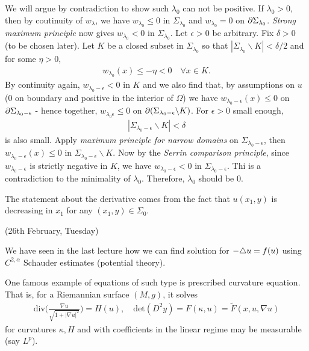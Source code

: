 \documentclass[12pt,a4paper]{article}
\newenvironment{proof}
{\begin{changemargin}{0.5cm}{0.5cm} 
	}%
	{\end{changemargin}
}
\newenvironment{p}
{\begin{proof} 
	}%
	{\end{proof}
}
\begin{document}
\begin{p}
\quad We will argue by contradiction to show such $\lambda_0$ can not be positive. If $\lambda_0 >0$, then by coutinuity of $w_{\lambda}$, we have $w_{\lambda_0} \leq 0$ in $\Sigma_{\lambda_0}$ and $w_{\lambda_0} =0$ on $\partial \Sigma_{\lambda_0}$. \emph{Strong maximum principle} now gives $w_{\lambda_0} < 0$ in $\Sigma_{\lambda_0}$.  Let $\epsilon >0$ be arbitrary. Fix $\delta >0$ (to be chosen later). Let $K$ be a closed subset in $\Sigma_{\lambda_0}$ so that $|\Sigma_{\lambda_0} \backslash K| < \delta/2$ and for some $\eta >0$,
\begin{align*}
w_{\lambda_0}(x) \leq -\eta <0 \quad \forall x\in K.
\end{align*}
By continuity again, $w_{\lambda_0 - \epsilon} < 0$ in $K$ and we also find that, by assumptions on $u$ (0 on boundary and positive in the interior of $\Omega$) we have $w_{\lambda_0 - \epsilon}(x) \leq 0$ on $\partial \Sigma_{\lambda_0 - \epsilon}$ - hence together, $w_{\lambda_0 \epsilon} \leq 0$ on $\partial (\Sigma_{\lambda_0 -\epsilon} \backslash K)$. For $\epsilon >0$ small enough,
\begin{align*}
|\Sigma_{\lambda_0 -\epsilon} \backslash K| < \delta
\end{align*}
is also small. Apply \emph{maximum principle for narrow domains} on $\Sigma_{\lambda_0 - \epsilon}$, then $w_{\lambda_0 - \epsilon}(x) \leq 0$ in $\Sigma_{\lambda_0 - \epsilon} \backslash K$. Now by the \emph{Serrin comparison principle}, since $w_{\lambda_0 -\epsilon}$ is strictly negative in $K$, we have $w_{\lambda_0 - \epsilon} < 0$ in $\Sigma_{\lambda_0 -\epsilon}$. Thi is a contradiction to the minimality of $\lambda_0$. Therefore, $\lambda_0$ should be 0.
\s

The statement about the derivative comes from the fact that $u(x_1, y)$ is decreasing in $x_1$ for any $(x_1, y) \in \Sigma_0$.

\eop
\end{p}
\s

\newday

(26th February, Tuesday)
\s

We have seen in the last lecture how we can find solution for $-\triangle u = f(u)$ using $C^{2, \alpha}$ Schauder estimates (potential theory).

\quad One famous example of equations of such type is prescribed curvature equation. That is, for a Riemannian surface $(M,g)$, it solves
\begin{align*}
\text{div}\big( \frac{\nabla u}{\sqrt{1 + |\nabla u|^2}} \big) = H(u), \quad \text{det}(D^2 y) = F(\kappa, u) = \tilde{F}(x, u, \nabla u)
\end{align*}
for curvatures $\kappa, H$ and with coefficients in the linear regime may be measurable (say $L^p$).
\s
\end{document}
